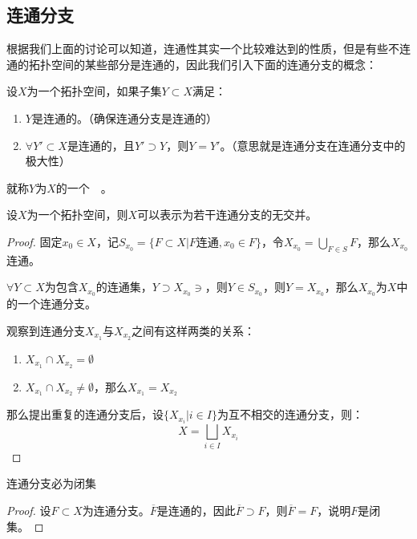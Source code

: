 \documentclass[lang=cn,10pt,device=pad]{elegantbook}
\newcommand{\cusong}{\CJKfamily{cusong}}%
\newcommand{\tl}[1]{\textcolor{myor}{#1}}
\newcommand{\gn}[1]{~\textcolor{mygrn}{\cusong{#1}}~}
\newcommand{\dabing}{\displaystyle\bigcup}
\newcommand{\dkh}[1]{\{#1\}}
\begin{document}
\subsection{连通分支}
根据我们上面的讨论可以知道，连通性其实一个比较难达到的性质，但是有些不连通的拓扑空间的某些部分是连通的，因此我们引入下面的连通分支的概念：
\begin{definition}[连通分支]
	设$X$为一个拓扑空间，如果子集$Y\subset X$满足：
	\begin{enumerate}
	\item $Y$是连通的。（\tl{确保连通分支是连通的}）
	\item $\forall Y'\subset X$是连通的，且$Y'\supset Y$，则$Y=  Y'$。（\tl{意思就是连通分支在连通分支中的极大性}）	
	\end{enumerate}
	就称$Y$为$X$的一个\gn{连通分支}。
\end{definition}
\begin{proposition}[连通分支的存在性]
	设$X$为一个拓扑空间，则$X$可以表示为若干连通分支的无交并。
\end{proposition}
\begin{proof}
固定$x_{0}\in X$，记$S_{x_{0}} = \dkh{F\subset X|F\text{连通},x_{0}\in F}$，令$X_{x_{0}} = \dabing_{F\in S}F $，那么$X_{x_{0}}$连通。

$\forall Y\subset X$为包含$X_{x_{0}}$的连通集，$Y\supset X_{x_{0}}\ni $，则$Y\in S_{x_{0}}$，则$Y = X_{x_{0}}$，那么$X_{x_{0}}$为$X$中的一个连通分支。

观察到连通分支$X_{x_{1}}$与$X_{x_{2}}$之间有这样两类的关系：
\begin{enumerate}
	\item $X_{x_{1}}\cap X_{x_{2}} = \emptyset$
	\item $X_{x_{1}}\cap X_{x_{2}} \neq  \emptyset$，那么$X_{x_{1}} = X_{x_{2}}$
\end{enumerate}

那么提出重复的连通分支后，设$\dkh{X_{x_{i}}|i\in I}$为互不相交的连通分支，则：
	\begin{equation}\label{c4-eq1}
		X = \bigsqcup_{i\in I}X_{x_{i}}
	\end{equation}
\end{proof}
\begin{proposition}[连通分支为闭集]\label{c4-m9}
	连通分支必为闭集
\end{proposition}
\begin{proof}
	设$F\subset X$为连通分支。$\overline{F}$是连通的，因此$\overline{F}\supset F$，则$\overline{F} = F$，说明$F$是闭集。
\end{proof}
\end{document}
